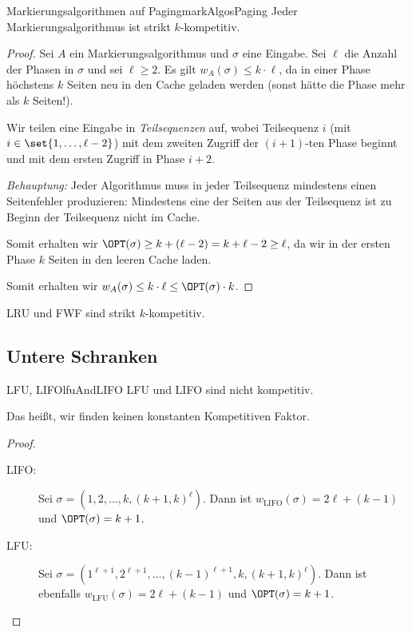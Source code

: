 \documentclass[language=ngerman,algolist]{TemplateLecture}
\begin{document}
\begin{thm}{Markierungsalgorithmen auf Paging}{markAlgosPaging}
    Jeder Markierungsalgorithmus ist strikt $k$-kompetitiv.
\end{thm}
\begin{proof}
    Sei $A$ ein Markierungsalgorithmus und $\sigma$ eine Eingabe. Sei $\ell$ die Anzahl der Phasen in $\sigma$ und sei $\ell \geq 2$. Es gilt $w_A(\sigma) \leq k \cdot \ell$, da in einer Phase höchstens $k$ Seiten neu in den Cache geladen werden (sonst hätte die Phase mehr als $k$ Seiten!).

    Wir teilen eine Eingabe in \emph{Teilsequenzen} auf, wobei Teilsequenz $i$ (mit $i \in \set{1,\ldots,\ell - 2}$) mit dem zweiten Zugriff der $(i+1)$-ten Phase beginnt und mit dem ersten Zugriff in Phase $i+2$.

    \emph{Behauptung:} Jeder Algorithmus muss in jeder Teilsequenz mindestens einen Seitenfehler produzieren: Mindestens eine der Seiten aus der Teilsequenz ist zu Beginn der Teilsequenz nicht im Cache.

    Somit erhalten wir $\OPT(\sigma) \geq k + (\ell - 2) = k + \ell - 2 \geq \ell$, da wir in der ersten Phase $k$ Seiten in den leeren Cache laden.

    Somit erhalten wir $w_A(\sigma) \leq k \cdot \ell \leq \OPT(\sigma) \cdot k$.
\end{proof}

\begin{corollary}
    LRU und FWF sind strikt $k$-kompetitiv.
\end{corollary}

\subsection{Untere Schranken}

\begin{thm}{LFU, LIFO}{lfuAndLIFO}
    LFU und LIFO sind nicht kompetitiv.
\end{thm}
Das heißt, wir finden keinen konstanten Kompetitiven Faktor.
\begin{proof}\leavevmode
    \begin{description}
        \item[LIFO:] Sei $\sigma = (1,2,\ldots,k,(k+1,k)^\ell)$. Dann ist $w_{\text{LIFO}}(\sigma) = 2\ell + (k-1)$ und $\OPT(\sigma) = k + 1$.
        \item[LFU:] Sei $\sigma = (1^{\ell+1},2^{\ell+1},\ldots,(k-1)^{\ell+1},k,(k+1,k)^\ell)$. Dann ist ebenfalls $w_{\text{LFU}}(\sigma) = 2\ell + (k-1)$ und $\OPT(\sigma) = k + 1$.
    \end{description}
\end{proof}
\end{document}
